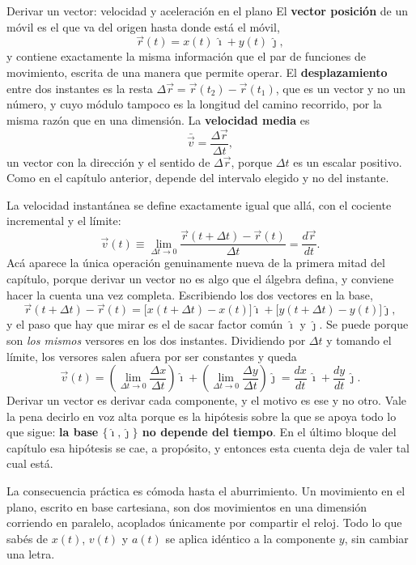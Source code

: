 \documentclass[11pt,openany]{book}
\begin{document}
\begin{bloque}{Derivar un vector: velocidad y aceleración en el plano}
El \textbf{vector posición} de un móvil es el que va del origen hasta donde está el móvil,
\[
\vec r(t) = x(t)\,\hat\imath + y(t)\,\hat\jmath,
\]
y contiene exactamente la misma información que el par de funciones de movimiento, escrita de una manera que permite operar. El \textbf{desplazamiento} entre dos instantes es la resta $\Delta\vec r = \vec r(t_2) - \vec r(t_1)$, que es un vector y no un número, y cuyo módulo tampoco es la longitud del camino recorrido, por la misma razón que en una dimensión. La \textbf{velocidad media} es
\[
\bar{\vec v} = \frac{\Delta\vec r}{\Delta t},
\]
un vector con la dirección y el sentido de $\Delta\vec r$, porque $\Delta t$ es un escalar positivo. Como en el capítulo anterior, depende del intervalo elegido y no del instante.

La velocidad instantánea se define exactamente igual que allá, con el cociente incremental y el límite:
\[
\vec v(t) \equiv \lim_{\Delta t\to 0}\frac{\vec r(t+\Delta t) - \vec r(t)}{\Delta t} = \frac{d\vec r}{dt}.
\]
Acá aparece la única operación genuinamente nueva de la primera mitad del capítulo, porque derivar un vector no es algo que el álgebra defina, y conviene hacer la cuenta una vez completa. Escribiendo los dos vectores en la base,
\[
\vec r(t+\Delta t) - \vec r(t) = \big[x(t+\Delta t) - x(t)\big]\hat\imath + \big[y(t+\Delta t) - y(t)\big]\hat\jmath,
\]
y el paso que hay que mirar es el de sacar factor común $\hat\imath$ y $\hat\jmath$. Se puede porque son \emph{los mismos} versores en los dos instantes. Dividiendo por $\Delta t$ y tomando el límite, los versores salen afuera por ser constantes y queda
\[
\vec v(t) = \left(\lim_{\Delta t\to 0}\frac{\Delta x}{\Delta t}\right)\hat\imath + \left(\lim_{\Delta t\to 0}\frac{\Delta y}{\Delta t}\right)\hat\jmath = \frac{dx}{dt}\,\hat\imath + \frac{dy}{dt}\,\hat\jmath.
\]
Derivar un vector es derivar cada componente, y el motivo es ese y no otro. Vale la pena decirlo en voz alta porque es la hipótesis sobre la que se apoya todo lo que sigue: \textbf{la base $\{\hat\imath,\hat\jmath\}$ no depende del tiempo}. En el último bloque del capítulo esa hipótesis se cae, a propósito, y entonces esta cuenta deja de valer tal cual está.

La consecuencia práctica es cómoda hasta el aburrimiento. Un movimiento en el plano, escrito en base cartesiana, son dos movimientos en una dimensión corriendo en paralelo, acoplados únicamente por compartir el reloj. Todo lo que sabés de $x(t)$, $v(t)$ y $a(t)$ se aplica idéntico a la componente $y$, sin cambiar una letra.


\end{bloque}
\end{document}
